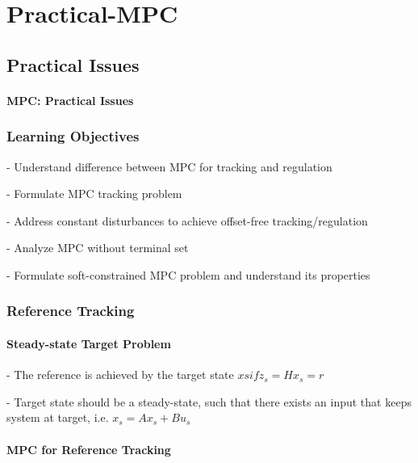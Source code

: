 \chapter{Practical-MPC}

\section{Practical Issues}

\subsubsection{MPC: Practical Issues}


\subsection{Learning Objectives}

- Understand difference between MPC for tracking and regulation

- Formulate MPC tracking problem

- Address constant disturbances to achieve offset-free tracking/regulation

- Analyze MPC without terminal set

- Formulate soft-constrained MPC problem and understand its properties

\subsection{Reference Tracking}



\subsubsection{Steady-state Target Problem}

- The reference is achieved by the target
state $xs if z_s = Hx_s = r$

- Target state should be a steady-state,
such that there exists an input that
keeps system at target, i.e. $x_s = Ax_s + Bu_s$



\subsubsection{MPC for Reference Tracking}



